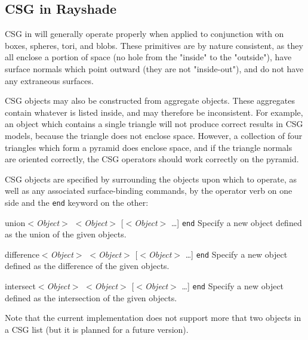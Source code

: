 \subsection{CSG in Rayshade}

CSG in \rayshade will generally operate properly when applied to
conjunction with
on boxes, spheres,
tori, and blobs.
These primitives are by nature consistent, as they all
enclose a portion of space (no hole from the "inside" to the
"outside"), have surface normals which point outward (they
are not "inside-out"), and do not have any extraneous surfaces.

CSG objects may also be constructed from aggregate objects.
These aggregates contain
whatever is listed inside, and may therefore be inconsistent.
For example, an object which contains a single triangle will not
produce correct results in CSG models, because the triangle does not enclose
space.  However, a collection of four triangles which form a pyramid
does enclose space, and if the triangle normals
are oriented correctly,
the CSG operators should work correctly on the pyramid.

CSG objects are specified by surrounding the objects upon
which to operate, as well as any associated surface-binding commands,
by the operator verb on one side and the {\tt end}
keyword on the other:

\begin{defkey}{union}{$<${\em Object}$>$ $<${\em Object}$>$
[$<${\em Object}$>$ \ldots] {\tt end}}
	Specify a new object defined as the union of the
	given objects.
\end{defkey}

\begin{defkey}{difference}{$<${\em Object}$>$ $<${\em Object}$>$ 
[$<${\em Object}$>$ \ldots] {\tt end}}
	Specify a new object defined as the difference of the
	given objects.
\end{defkey}

\begin{defkey}{intersect}{$<${\em Object}$>$ $<${\em Object}$>$
[$<${\em Object}$>$ \ldots] {\tt end}}
	Specify a new object defined as the intersection of the
	given objects.
\end{defkey}

Note that the current implementation does not support more that two
objects in a CSG list (but it is planned for a future version).

% 

